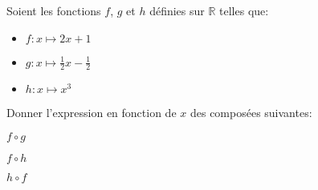 

Soient les fonctions $f$, $g$ et $h$ définies sur $\mathbb{R}$ telles que:

\begin{itemize}
 \item $f: x \longmapsto 2x+1$
 \item $g: x \longmapsto \frac{1}{2}x - \frac{1}{2}$
 \item $h: x \longmapsto x^3$
\end{itemize}

Donner l'expression en fonction de $x$ des composées suivantes:

\question{} $f \circ g$


\question{} $f \circ h$


\question{} $h \circ f$

